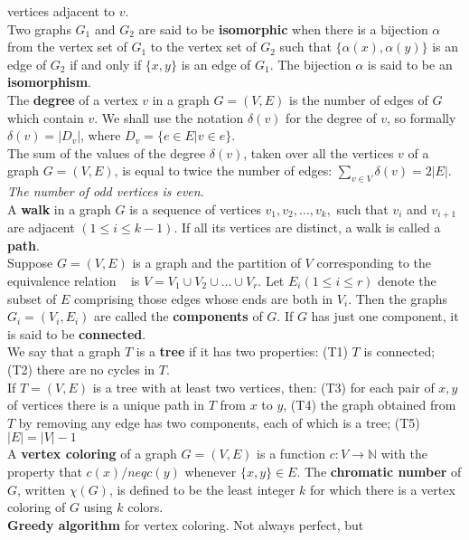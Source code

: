 \documentclass[10pt,landscape]{article}
\begin{document}
\begin{multicols}{3}
vertices adjacent to $v$.\\
Two graphs $G_{1}$ and $G_{2}$ are said to be \textbf{isomorphic} when
there is a bijection $\alpha$ from the vertex set of $G_{1}$ to the
vertex set of $G_{2}$ such that $\{\alpha(x), \alpha(y)\}$ is an edge
of $G_{2}$ if and only if $\{x, y\}$ is an edge of $G_{1}$. The
bijection $\alpha$ is said to be an \textbf{isomorphism}.\\
The \textbf{degree} of a vertex $v$ in a graph $G = (V,E)$ is the
number of edges of $G$ which contain $v$. We shall use the notation
$\delta(v)$ for the degree of $v$, so formally $\delta(v) = |D_{v}|$,
where $D_{v} = \{e \in E | v \in e \}$.\\
The sum of the values of the degree $\delta(v)$, taken over all the
vertices $v$ of a graph $G = (V,E)$, is equal to twice the number of
edges: $\displaystyle\sum_{v \in V} \delta(v) = 2|E|$.\\
\textit{The number of odd vertices is even}.\\
A \textbf{walk} in a graph $G$ is a sequence of vertices
$v_{1},v_{2},\dots , v_{k},$ such that $v_{i}$ and $v_{i+1}$ are
adjacent $(1 \leq i \leq k-1)$. If all its vertices are distinct, a
walk is called a \textbf{path}.\\
Suppose $G = (V,E)$ is a graph and the partition of $V$ corresponding
to the equivalence relation ~ is $V = V_{1} \cup V_{2} \cup \dots \cup
V_{r}$. Let $E_{i} (1 \leq i \leq r)$ denote the subset of $E$
comprising those edges whose ends are both in $V_{i}$. Then the graphs
$G_{i} = (V_{i}, E_{i})$ are called the \textbf{components} of $G$. If
$G$ has just one component, it is said to be \textbf{connected}.\\
We say that a graph $T$ is a \textbf{tree} if it has two properties:
(T1) $T$ is connected; (T2) there are no cycles in $T$.\\
If $T = (V,E)$ is a tree with at least two vertices, then: (T3) for
each pair of $x,y$ of vertices there is a unique path in $T$ from $x$
to $y$, (T4) the graph obtained from $T$ by removing any edge has two
components, each of which is a tree; (T5) $|E| = |V|-1$\\
A \textbf{vertex coloring} of a graph $G = (V,E)$ is a function $c: V
\to \mathbb{N}$ with the property that $c(x) /neq c(y)$ whenever
$\{x,y\} \in E$. The \textbf{chromatic number} of $G$, written
$\chi(G)$, is defined to be the least integer $k$ for which there is a
vertex coloring of $G$ using $k$ colors.\\
\textbf{Greedy algorithm} for vertex coloring. Not always perfect, but

\end{multicols}
\end{document}
